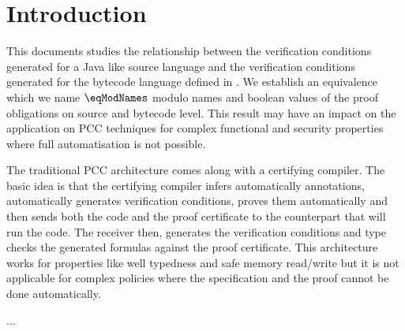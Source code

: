 \section{Introduction}
This documents studies the relationship between
the verification conditions generated for a Java like source 
language and the verification conditions generated for the bytecode language 
defined in \cite{P05BSV}. We establish an equivalence which we name $\eqModNames$
 modulo names and boolean values of the proof obligations on source and bytecode level.
 This result may have an impact on the application on PCC techniques for 
complex functional and security properties where full automatisation is not possible.

The traditional PCC architecture comes along with a certifying compiler. The basic idea is that the certifying compiler  infers automatically annotations,
automatically generates verification conditions, proves them automatically and then sends both the code and the proof certificate to the 
counterpart that will run the code. The receiver then, generates the verification conditions and  type checks the generated formulas against the proof certificate.
This architecture works for properties like well typedness and safe memory read/write but it is not applicable for complex policies where the specification and the proof 
cannot be done automatically. 

... 
